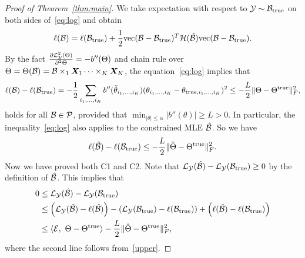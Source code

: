 \documentclass[12pt]{article}
\theoremstyle{definition}
\theoremstyle{definition}
\begin{document}
\begin{proof}[Proof of Theorem~\ref{thm:main}]
We take expectation with respect to $\mathcal{Y}\sim \mathcal{B}_{\textup{true}}$ on both sides of~\eqref{eq:log} and obtain
\begin{equation}\label{eq:log}
\ell(\mathcal{B})=\ell(\mathcal{B}_{\textup{true}})+{1\over 2}\text{vec}(\mathcal{B}-\mathcal{B}_{\textup{true}})^T \mathcal{H}(\check {\mathcal{B}})\text{vec}(\mathcal{B}-\mathcal{B}_{\textup{true}}).
\end{equation}
By the fact ${\partial \mathcal{L}_{\mathcal{Y}}^2(\Theta)\over \partial^2 \Theta}=-b''(\Theta)$ and chain rule over $\Theta=\Theta(\mathcal{B})=\mathcal{B}\times_1\bm X_1\cdots\times_K\bm X_K$, the equation~\eqref{eq:log} implies that 
\begin{equation}\label{eq:logB}
\ell(\mathcal{B})-\ell(\mathcal{B}_{\textup{true}})=-{1\over 2}\sum_{i_1,\ldots,i_K}b''(\check \theta_{i_1,\ldots,i_K}) (\theta_{i_1,\ldots,i_K}-\theta_{\text{true},i_1,\ldots,i_K})^2 \leq -{L \over 2}\lVert\Theta-\Theta^{\text{true}}\rVert_F^2,
\end{equation}
holds for all $\mathcal{B}\in\mathcal{P}$, provided that $\min_{|\theta|\leq \alpha}|b''(\theta)|\geq L>0$. In particular, the inequality~\eqref{eq:log} also applies to the constrained MLE $\hat {\mathcal{B}}$. So we have
\begin{equation}\label{upper}
\ell(\hat {\mathcal{B}})-\ell(\mathcal{B}_{\textup{true}})\leq -{L \over 2}\lVert\hat \Theta-\Theta^{\text{true}}\rVert_F^2.
\end{equation}
Now we have proved both C1 and C2. Note that $\mathcal{L}_{\mathcal{Y}}(\hat {\mathcal{B}})- \mathcal{L}_{\mathcal{Y}}(\mathcal{B}_{\textup{true}})\geq 0$ by the definition of $\hat {\mathcal{B}}$. This implies that
\begin{align}\label{eq:F-norm}
0&\leq \mathcal{L}_{\mathcal{Y}}(\hat {\mathcal{B}})- \mathcal{L}_{\mathcal{Y}}(\mathcal{B}_{\textup{true}}) \\
&\leq \left(\mathcal{L}_{\mathcal{Y}}(\hat {\mathcal{B}})-\ell(\hat {\mathcal{B}})\right)-\left( \mathcal{L}_{\mathcal{Y}}(\mathcal{B}_{\textup{true}})-\ell(\mathcal{B}_{\textup{true}})\right)+\left(\ell(\hat {\mathcal{B}})-\ell(\mathcal{B}_{\textup{true}})\right)\\
&\leq \langle\mathcal{E},\ \Theta-\Theta^{\text{true}}    \rangle -{L\over 2}\lVert\hat \Theta-\Theta^{\text{true}}\rVert_F^2,
\end{align}
where the second line follows from~\eqref{upper}. 


\end{proof}
\end{document}
